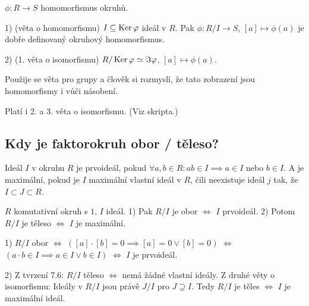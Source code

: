 \documentclass[12pt]{article}                   %
\begin{document}
        \begin{veta}
            $\phi: R \rightarrow S$ homomorfismus okruhů.

            1) (věta o homomorfismu) $I \subseteq \operatorname{Ker} \varphi$ ideál v $R$. Pak $\phi: R/I \rightarrow S$, $[a] \mapsto \phi(a)$ je dobře definovaný okruhový homomorfismus.

            2) (1. věta o isomorfismu) $R / \operatorname{Ker} \varphi \simeq \Im \varphi$, $[a] \mapsto \phi(a)$.

            \begin{dukazin}
                Použije se věta pro grupy a člověk si rozmyslí, že tato zobrazení jsou homomorfismy i vůči násobení.
            \end{dukazin}
        \end{veta}

        \begin{poznamka}
            Platí i 2. a 3. věta o isomorfismu. (Viz skripta.)
        \end{poznamka}

    \subsection{Kdy je faktorokruh obor / těleso?}
        \begin{definice}
            Ideál $I$ v okruhu $R$ je prvoideál, pokud $\forall a, b \in R: ab \in I \implies a \in I$ nebo $b \in I$. A je maximální, pokud je $I$ maximální vlastní ideál v $R$, čili neexistuje ideál $j$ tak, že $I \subset J \subset R$.
        \end{definice}

        \begin{veta}
            $R$ komutativní okruh s $1$, $I$ ideál. 1) Pak $R/I$ je obor $\Leftrightarrow$ $I$ prvoideál. 2) Potom $R/I$ je těleso $\Leftrightarrow$ $I$ je maximální.

            \begin{dukazin}
                1) $R/I$ obor $\Leftrightarrow$ $([a]·[b] = 0 \implies [a] = 0 \lor [b] = 0)$ $\Leftrightarrow$ $(a·b \in I \implies a \in I \lor b \in I)$ $\Leftrightarrow$ $I$ je prvoideál.

                2) Z tvrzení 7.6: $R/I$ těleso $\Leftrightarrow$ nemá žádné vlastní ideály. Z druhé věty o isomorfismu: Ideály v $R/I$ jsou právě $J/I$ pro $J \supseteq I$. Tedy $R/I$ je těles $\Leftrightarrow$ $I$ je maximální ideál.
            \end{dukazin}
        \end{veta}
\end{document}
